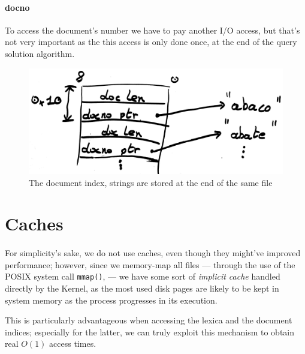 \paragraph{docno}
To access the document's number we have to pay another I/O access, but that's not very important as the this access is only done once, at the end of the query solution algorithm.

\begin{figure}[h]
	\centering
	\includegraphics[width=0.7\linewidth]{assets/document_index}
	\caption{The document index, strings are stored at the end of the same file}
	\label{fig:documentindex}
\end{figure}

\section{Caches}

\paragraph{}
For simplicity's sake, we do not use caches, even though they might've improved performance; however, since we memory-map all files --- through the use of the POSIX system call \texttt{mmap()}, --- we have some sort of \textit{implicit cache} handled directly by the Kernel, as the most used disk pages are likely to be kept in system memory as the process progresses in its execution.

This is particularly advantageous when accessing the lexica and the document indices; especially for the latter, we can truly exploit this mechanism to obtain real $O(1)$ access times.

